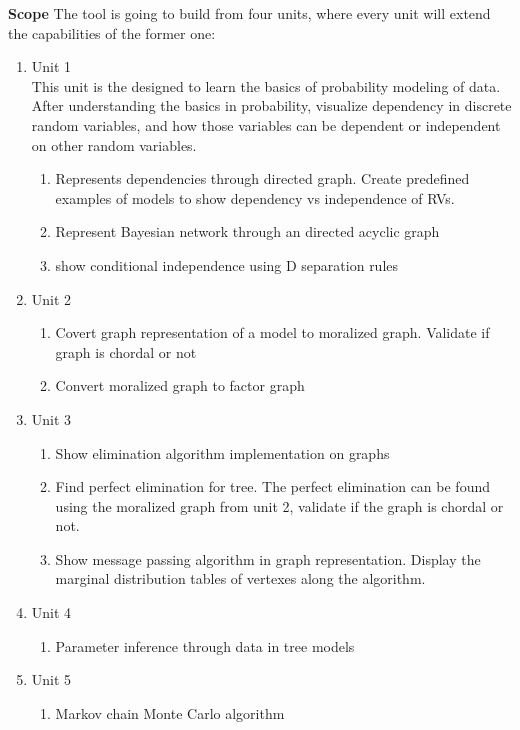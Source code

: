 \documentclass{article}
\begin{document}
    \textbf{Scope}
    The tool is going to build from four units, where every unit will extend the capabilities of the former one:
    \begin{enumerate}
        \item Unit 1\\
        This unit is the designed to learn the basics of probability modeling of data. After understanding the basics in probability, visualize
        dependency in discrete random variables, and how those variables can be dependent or independent on other random variables.
        \begin{enumerate}
            \item Represents dependencies through directed graph. Create predefined examples of models to show dependency vs independence of RVs.
            \item Represent Bayesian network through an directed acyclic graph
            \item show conditional independence using D separation rules
        \end{enumerate}
        \item Unit 2\\
        \begin{enumerate}
            \item Covert graph representation of a model to moralized graph. Validate if graph is chordal or not
            \item Convert moralized graph to factor graph
        \end{enumerate}
        \item Unit 3\\
        \begin{enumerate}
            \item Show elimination algorithm implementation on graphs
            \item Find perfect elimination for tree. The perfect elimination can be found using the moralized graph from unit 2, validate if the graph is chordal or not.
            \item Show message passing algorithm in graph representation. Display the marginal distribution tables of vertexes along the algorithm.
        \end{enumerate}
        \item Unit 4\\
        \begin{enumerate}
            \item Parameter inference through data in tree models
        \end{enumerate}
        \item Unit 5\\
        \begin{enumerate}
            \item Markov chain Monte Carlo algorithm
        \end{enumerate}
    \end{enumerate}
\end{document}
